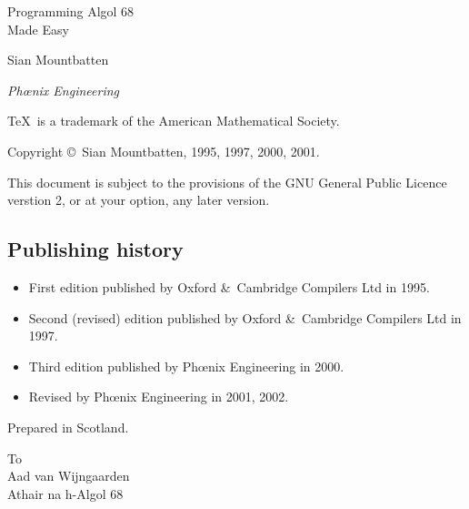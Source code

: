 %
%
\thispagestyle{empty}
\vglue 20mm
\begin{center}
\Huge Programming Algol 68\\ Made Easy
\end{center}
\vskip 10mm
\begin{center}
\Large Sian Mountbatten
\end{center}
\vfill
\begin{center}
\emph{Ph\oe{}nix Engineering}
\end{center}
\newpage
\thispagestyle{empty}
\parindent=0mm
\vfill
\small
\TeX\ is a trademark of the American Mathematical Society.\par
\smallskip
Copyright \copyright\ Sian Mountbatten, 1995, 1997, 2000, 2001.\par
\medskip
This document is subject to the provisions of the GNU General Public
Licence verstion 2, or at your option, any later version.\par
\bigskip
\subsection*{Publishing history}
\begin{itemize}
\item First edition published by Oxford \&\ Cambridge Compilers Ltd
in 1995.
\item Second (revised) edition published by Oxford \&\ Cambridge
Compilers Ltd in 1997.
\item Third edition published by Ph\oe{}nix Engineering in 2000.
\item Revised by Ph\oe{}nix Engineering in 2001, 2002.
\end{itemize}
\vfill
Prepared in Scotland.
\newpage
\thispagestyle{empty}
\vglue 40mm
\begin{flushright}
\textsf To\\
\medskip
\Large Aad van Wijngaarden\\
\bigskip\medskip
\normalsize Athair na h-Algol 68
\end{flushright}
\newpage
